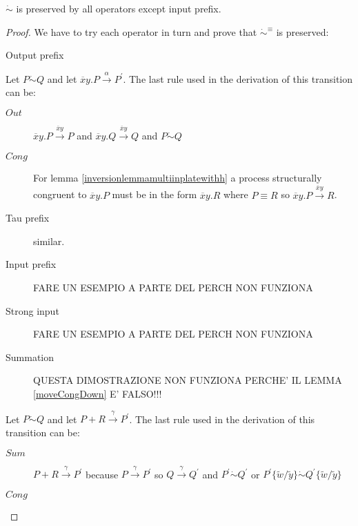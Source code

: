 \begin{proposition}
  $\dot{\sim}$ is preserved by all operators except input prefix.
  \begin{proof}
    We have to try each operator in turn and prove that $\dot{\sim}^{\equiv}$ is preserved:
    \begin{description}
      \item[Output prefix]
    \end{description}
	Let $P \dot{\sim} Q$ and let $\overline{x}y.P \xrightarrow{\alpha} P^{'}$. The last rule used in the derivation of this transition can be:
	\begin{description}
	  \item[$Out$]
	    $\overline{x}y.P \xrightarrow{\overline{x}y} P$ and $\overline{x}y.Q \xrightarrow{\overline{x}y} Q$ and $P \dot{\sim} Q$
	  \item[$Cong$]
	    For lemma \ref{inversionlemmamultiinplatewithh} a process structurally congruent to $\overline{x}y.P$ must be in the form $\overline{x}y.R$ where $P \equiv R$ so $\overline{x}y.P \xrightarrow{\overline{x}y} R$.
	\end{description}
    \begin{description}
      \item[Tau prefix] similar.
    \end{description}
    \begin{description}
      \item[Input prefix] FARE UN ESEMPIO A PARTE DEL PERCH NON FUNZIONA
    \end{description}
    \begin{description}
      \item[Strong input] FARE UN ESEMPIO A PARTE DEL PERCH NON FUNZIONA	
    \end{description}
    \begin{description}
      \item[Summation] QUESTA DIMOSTRAZIONE NON FUNZIONA PERCHE' IL LEMMA \ref{moveCongDown} E' FALSO!!!
    \end{description}
	Let $P \dot{\sim} Q$ and let $P+R \xrightarrow{\gamma} P^{'}$. The last rule used in the derivation of this transition can be:
	\begin{description}
	  \item[$Sum$]
	    $P+R \xrightarrow{\gamma} P^{'}$ because $P \xrightarrow{\gamma} P^{'}$ so $Q \xrightarrow{\gamma} Q^{'}$ and $P^{'} \dot{\sim} Q^{'}$ or $P^{'}\{\tilde{w}/\tilde{y}\} \dot{\sim} Q^{'}\{\tilde{w}/\tilde{y}\}$
	  \item[$Cong$]

\end{description}
\end{proof}
\end{proposition}
